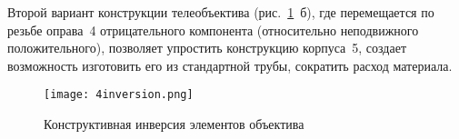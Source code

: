 Второй вариант конструкции телеобъектива (рис.~\ref{pic:4inversion}~б), где перемещается по резьбе оправа~4 отрицательного компонента (относительно неподвижного положительного), позволяет упростить конструкцию корпуса~5, создает возможность изготовить его из стандартной трубы, сократить расход материала.

\begin{figure}[h!]
	\caption{Конструктивная инверсия элементов объектива}
	\texttt{[image: 4inversion.png]}
	\label{pic:4inversion}
\end{figure}
